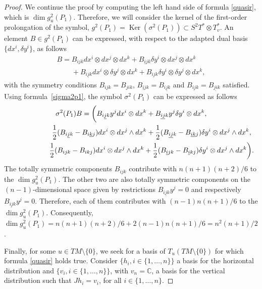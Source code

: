 \documentclass[pdftex]{sigma}
\numberwithin{equation}{section}
\begin{document}
\begin{proof}
We continue the proof by computing the left hand side of formula
\eqref{quasir}, which is $\dim g^2_u(P_1)$.
Therefore, we will consider the kernel of the f\/irst-order prolongation of the symbol,
$g^2(P_1)=\operatorname{Ker}\left(\sigma^2(P_1)\right)\subset
S^2T^*\otimes T^*_v$. An element $B\in g^2(P_1)$ can be expressed,
with respect to the adapted dual basis $\{dx^i, \delta y^i\}$, as
follows
\begin{gather*}
B=B_{ijk}dx^i\otimes dx^j\otimes dx^k + B_{\underline{i}jk}\delta
y^i \otimes dx^j \otimes dx^k \\
\phantom{B=}{} + B_{i\underline{j}k}dx^i \otimes
\delta y^j \otimes dx^k + B_{\underline{ij}k}\delta y^i \otimes
\delta y^j \otimes dx^k,
\end{gather*}
with the symmetry conditions $B_{ijk}=B_{jik}$,
$B_{\underline{i}jk}=B_{i\underline{j}k}$ and
$B_{\underline{ij}k}=B_{\underline{ji}k}$ satisf\/ied. Using formula~\eqref{sigma2p1}, the symbol $\sigma^2(P_1)$ can be expressed as
follows
\begin{gather*}
\sigma^2(P_1)B  = \bigg(B_{i\underline{j}k}y^j dx^i \otimes dx^k +
B_{\underline{ij}k}y^j \delta y^i \otimes dx^k,  \\
\hphantom{\sigma^2(P_1)B  = \bigg(}{}  \frac{1}{2}(B_{i\underline{j}k} -
B_{i\underline{k}j})dx^i\otimes dx^j \wedge dx^k +
\frac{1}{2}(B_{\underline{ij}k} - B_{\underline{ik}j})\delta
y^i\otimes dx^j \wedge dx^k, \\
\hphantom{\sigma^2(P_1)B  = \bigg(}{}  \frac{1}{2}(B_{ijk} - B_{ikj})dx^i\otimes dx^j \wedge
dx^k + \frac{1}{2}(B_{\underline{i}jk} -
B_{\underline{i}kj})\delta y^i\otimes dx^j \wedge dx^k\bigg).
\end{gather*}
The totally symmetric components $B_{ijk}$ contribute with
$n(n+1)(n+2)/6$ to the $\dim g^2_u(P_1)$. The other two are also
totally symmetric components on the $(n-1)$-dimensional space
given by restrictions $B_{i\underline{j}k}y^j=0$ and respectively
$B_{\underline{ij}k}y^j=0$. Therefore, each of them contributes
with $(n-1)n(n+1)/6$ to the $\dim g^2_u(P_1)$. Consequently, $\dim
g^2_u(P_1)=n(n+1)(n+2)/6+2(n-1)n(n+1)/6=n^2(n+1)/2$.

Finally, for some $u\in TM\setminus\{0\} $, we seek for a
basis of $T_u(TM\setminus\{0\})$ for
which formula \eqref{quasir} holds true.  Consider $\{h_i, i\in \{1,\dots ,n\}\}$ a basis for the horizontal
distribution and $\{v_i, i\in \{1,\dots ,n\}\}$, with $v_n=\mathbb{C}$,
a basis for the vertical distribution such that $Jh_i=v_i$, for all
$i\in \{1,\dots ,n\}$.


\end{proof}
\end{document}
